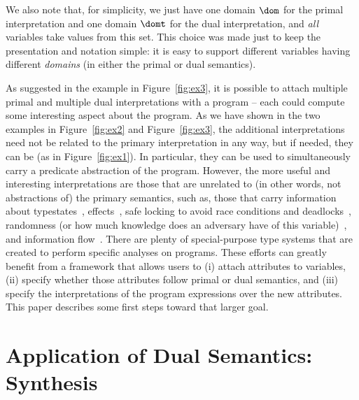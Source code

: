 \documentclass[preprint]{sig-alternate-05-2015}
\begin{document}
{We also note that, for simplicity, we just have one domain $\dom$
for the primal interpretation and one domain $\domt$ for the dual
interpretation, and {\em{all}} variables take values from this set.
This choice was made just to keep the presentation and notation
simple: it is easy to support different variables having different
{\em{domains}} (in either the primal or dual semantics).

As suggested in the example in Figure~\ref{fig:ex3}, it is possible
to attach multiple primal and multiple dual interpretations with
a program -- each could compute some interesting aspect about the
program. As we have shown in the two examples in Figure~\ref{fig:ex2}
and Figure~\ref{fig:ex3}, the additional
interpretations need not be related to the primary interpretation in
any way, but if needed, they can be (as in Figure~\ref{fig:ex1}).
In particular, they can be used to simultaneously carry a predicate
abstraction of the program. However, the more useful and interesting
interpretations are those that are unrelated to (in other words,
not abstractions of) the primary semantics, such as,
those that carry information about
typestates~\cite{DBLP:journals/tse/StromY86},
effects~\cite{DBLP:conf/popl/LucassenG88},
safe locking to avoid race conditions and
deadlocks~\cite{DBLP:journals/toplas/AbadiFF06},
randomness (or how much knowledge does an adversary have
of this variable)~\cite{DBLP:conf/csfw/MalozemoffKG14},
and information flow~\cite{DBLP:journals/jsac/SabelfeldM03}.
There are plenty of special-purpose type systems that
are created to perform specific analyses on programs.
These efforts can greatly benefit from a framework
that allows users to
(i) attach attributes to variables,
(ii) specify whether those attributes follow primal
or dual semantics, and (iii) specify the
interpretations of the program expressions over the
new attributes.
This paper describes some first steps toward that larger goal.



\section{Application of Dual Semantics: Synthesis}
\label{sec:synthesis}

}
\end{document}
